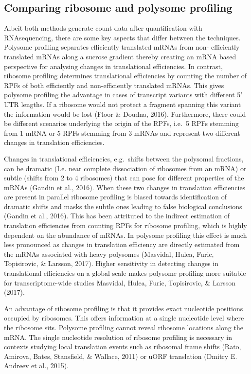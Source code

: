 \documentclass[
  12pt,
  openany]{book}
\begin{document}
\subsection{Comparing ribosome and polysome profiling}

Albeit both methods generate count data after quantification with RNAsequencing, there are some key aspects that differ between the techniques. Polysome profiling separates efficiently translated mRNAs from non- efficiently translated mRNAs along a sucrose gradient thereby creating an mRNA based perspective for analysing changes in translational efficiencies. In contrast, ribosome profiling determines translational efficiencies by counting the number of RPFs of both efficiently and non-efficiently translated mRNAs. This gives polysome profiling the advantage in cases of transcript variants with different 5' UTR lengths. If a ribosome would not protect a fragment spanning this variant the information would be lost (Floor \& Doudna, 2016). Furthermore, there could be different scenarios underlying the origin of the RPFs, i.e.~5 RPFs stemming from 1 mRNA or 5 RPFs stemming from 3 mRNAs and represent two different changes in translation efficiencies.

Changes in translational efficiencies, e.g.~shifts between the polysomal fractions, can be dramatic (I.e. near complete dissociation of ribosomes from an mRNA) or subtle (shifts from 2 to 4 ribosomes) that can pose for different properties of the mRNAs (Gandin et al., 2016). When these two changes in translation efficiencies are present in parallel ribosome profiling is biased towards identification of dramatic shifts and masks the subtle ones leading to false biological conclusions (Gandin et al., 2016). This has been attrituted to the indirect estimation of translation efficiencies from counting RPFs for ribosome profiling, which is highly dependent on the abundance of mRNAs. In polysome profiling this effect is much less pronounced as changes in translation efficiency are directly estimated from the mRNAs associated with heavy polysomes (Masvidal, Hulea, Furic, Topisirovic, \& Larsson, 2017). Higher sensitivity in detecting changes in translational efficiencies on a global scale makes polysome profiling more suitable for transcriptome-wide studies Masvidal, Hulea, Furic, Topisirovic, \& Larsson (2017).

An advantage of ribosome profiling is that it provides exact nucleotide positions occupied by ribosomes. This offers information at a single nucleotide level where the ribosome sits. Polysome profiling cannot reveal ribosome locations along the mRNA. The single nucleotide resolution of ribosome profiling is necessary in contexts studying local translation events such as ribosomal frame shifts (Rato, Amirova, Bates, Stansfield, \& Wallace, 2011) or uORF translation (Dmitry E. Andreev et al., 2015).
\end{document}
